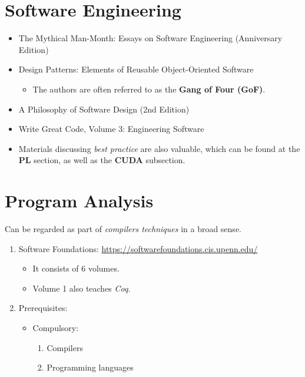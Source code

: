 \documentclass{article}
\begin{document}
\section{Software Engineering}
\begin{itemize}
    \item The Mythical Man-Month: Essays on Software Engineering (Anniversary Edition) \cite{brooks1995mythical}
    \item Design Patterns: Elements of Reusable Object-Oriented Software
    \cite{gamma1995design}
    \begin{itemize}
        \item The authors are often referred to as the \textbf{Gang of Four (GoF)}.
    \end{itemize}
    \item A Philosophy of Software Design (2nd Edition) \cite{ousterhout2018philosophy}
    \item Write Great Code, Volume 3: Engineering Software
    \cite{hyde2020writegreatcode}
    \item Materials discussing \emph{best practice} are also valuable, which can be found at the \textbf{PL} section, as well as the \textbf{CUDA} subsection.
\end{itemize}

\section{Program Analysis}
Can be regarded as part of \emph{compilers techniques} in a broad sense.
\begin{enumerate}
    \item Software Foundations:
        \href{https://softwarefoundations.cis.upenn.edu/}{https://softwarefoundations.cis.upenn.edu/}
        \begin{itemize}
            \item It consists of 6 volumes.
            \item Volume 1 also teaches \emph{Coq}.
        \end{itemize}
    \item Prerequisites:
    \begin{itemize}
        \item Compulsory:
        \begin{enumerate}
            \item Compilers
            \item Programming languages
        \end{enumerate}
    \end{itemize}
\end{enumerate}
\end{document}
